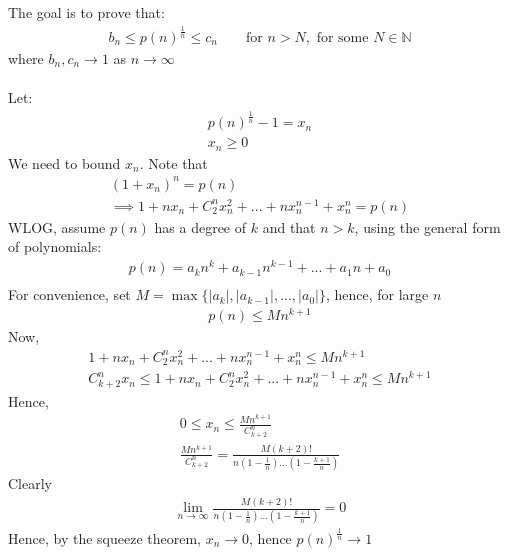 \documentclass[12pt]{book}
\theoremstyle{definition}
\begin{document}
\begin{sol}

The goal is to prove that:
\begin{align*}
b_n \leq p(n)^{\frac{1}{n}} \leq c_n	 \qquad \text{for } n > N, \text{ for some }N\in \mathbb{N} 
\end{align*} 
where $b_n, c_n \to 1$ as $n \to \infty$\\
\\
Let:
\begin{align*}
	p(n)^{\frac{1}{n}} -1 = x_n\\
x_n\geq 0
\end{align*}
We need to bound $x_n$. Note that
\begin{align*}
(1+x_n)^n = p(n)\\
\implies 1+nx_n+C_2^nx_n^2+...+nx_n^{n-1} +x_n^n	 = p(n)
\end{align*}
WLOG, assume $p(n)$ has a degree of $k$ and that $n>k$, using the general form of polynomials:
\begin{align*}
p(n) = a_kn^k + a_{k-1}n^{k-1}+...+a_1n+a_0\\	
\end{align*}
For convenience, set $M = \max\{|a_k|,|a_{k-1}|,...,|a_0|\}$, hence, for large $n$
\begin{align*}
p(n) \leq Mn^{k+1}	
\end{align*}
Now,
\begin{align*}
1+nx_n+C_2^nx_n^2+...+nx_n^{n-1} +x_n^n	\leq Mn^{k+1} \\
C^n_{k+2}x_n \leq 	1+nx_n+C_2^nx_n^2+...+nx_n^{n-1} +x_n^n \leq Mn^{k+1}
\end{align*}
Hence,
\begin{align*}
	0\leq x_n \leq \frac{Mn^{k+1}}{C^n_{k+2}}\\
	\frac{Mn^{k+1}}{C^n_{k+2}} = \frac{M(k+2)!}{n\left( 1-\frac{1}{n}\right)...\left( 1-\frac{k+1}{n}\right)}
\end{align*}
Clearly
\begin{align*}
	\lim_{n\to \infty}\frac{M(k+2)!}{n\left( 1-\frac{1}{n}\right)...\left( 1-\frac{k+1}{n}\right)} = 0
\end{align*}
Hence, by the squeeze theorem, $x_n\to 0$, hence $p(n)^{\frac{1}{n}}\to 1$

	
\end{sol}

\end{document}
